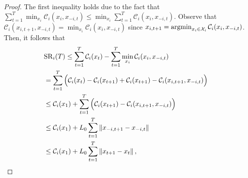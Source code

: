 \begin{proof}
The first inequality holds due to the fact that $\sum_{t=1}^T \min_{x_i}\mathcal{C}_i(x_i,x_{-i,t})\leq \min_{x_i}\sum_{t=1}^T \mathcal{C}_i(x_i,x_{-i,t})$.
Observe that $\mathcal{C}_i(x_{i,t+1},x_{-i,t})=\min_{x_i}\mathcal{C}_i(x_i,x_{-i,t})$ since $x_{i,t+1}=\mathop{\rm{arg min}}_{x_i \in \mathcal{X}_i} \mathcal{C}_{i} (x_i, x_{-i,t})$. Then, it follows that
%
\begin{align}\label{eq:BR_no_temp1}
    &{\rm{SR}}_i(T) \leq \sum_{t=1}^T \mathcal{C}_i(x_t) -  \sum_{t=1}^T \min_{x_i}\mathcal{C}_i(x_i,x_{-i,t}) \nonumber\\
    & = \sum_{t=1}^T \Big( \mathcal{C}_i(x_t)- \mathcal{C}_i(x_{t+1})+ \mathcal{C}_i(x_{t+1}) - \mathcal{C}_i(x_{i,t+1},x_{-i,t}) \Big) \nonumber \\
    & \leq \mathcal{C}_i(x_1) + \sum_{t=1}^T \Big(\mathcal{C}_i(x_{t+1}) - \mathcal{C}_i(x_{i,t+1},x_{-i,t}) \Big) \nonumber \\
    & \leq  \mathcal{C}_i(x_1) + L_0 \sum_{t=1}^T \left\|x_{-i,t+1} - x_{-i,t}\right\| \nonumber \\
    & \leq  \mathcal{C}_i(x_1) + L_0 \sum_{t=1}^T \left\|x_{t+1} - x_{t}\right\|,
\end{align}

\end{proof}
